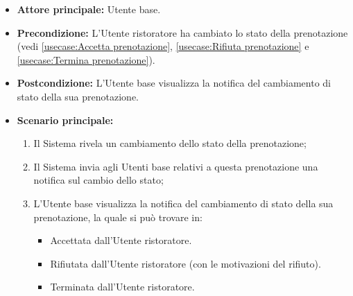 \label{usecase:Visualizzazione notifica stato della prenotazione}
\begin{itemize}
	\item \textbf{Attore principale:} Utente base.

	\item \textbf{Precondizione:} L'Utente ristoratore ha cambiato lo stato della prenotazione (vedi \autoref{usecase:Accetta prenotazione},
	      \autoref{usecase:Rifiuta prenotazione} e \autoref{usecase:Termina prenotazione}).


	\item \textbf{Postcondizione:} L'Utente base visualizza la notifica del cambiamento di stato della sua prenotazione.

	\item \textbf{Scenario principale:}
	      \begin{enumerate}
		      \item Il Sistema rivela un cambiamento dello stato della prenotazione;
		      \item Il Sistema invia agli Utenti base relativi a questa
		            prenotazione una notifica sul cambio dello stato;
		      \item L'Utente base visualizza la notifica del cambiamento di stato della sua prenotazione, la quale si può trovare in:
		            \begin{itemize}
			            \item Accettata dall'Utente ristoratore.
			            \item Rifiutata dall'Utente ristoratore (con le motivazioni del rifiuto).
			            \item Terminata dall'Utente ristoratore.
		            \end{itemize}
	      \end{enumerate}
\end{itemize}
